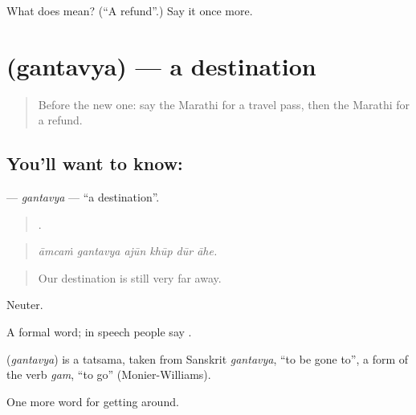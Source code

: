 \begin{tcolorbox}[breakable,colback=teal!4,colframe=teal!35!black,title={Before you move on}]
What does  mean? (\textquotedblleft{}A refund\textquotedblright{}.) Say it once more.
\end{tcolorbox}
\section[\texorpdfstring{\mr{गंतव्य} (gantavya)}{गंतव्य (gantavya)}]{ (gantavya) — a destination}

\label{lesson:MR-C398-gantavya}



\begin{quote}
Before the new one: say the Marathi for a travel pass, then the Marathi for a refund.
\end{quote}

\subsection*{You'll want to know: }
\textbf{} — \emph{gantavya} — \textquotedblleft{}a destination\textquotedblright{}.

\begin{quote}
     .
\end{quote}

\begin{quote}
\emph{āmcaṁ gantavya ajūn khūp dūr āhe.}
\end{quote}

\begin{quote}
Our destination is still very far away.
\end{quote}

Neuter.

A formal word; in speech people say     .

\begin{cousinweb}
\textbf{} (\emph{gantavya}) is a tatsama, taken from Sanskrit \emph{gantavya}, \textquotedblleft{}to be gone to\textquotedblright{}, a form of the verb \emph{gam}, \textquotedblleft{}to go\textquotedblright{} (Monier-Williams).
\end{cousinweb}

\begin{grammarlens}[title={What you've built}]
One more word for getting around.
\end{grammarlens}

